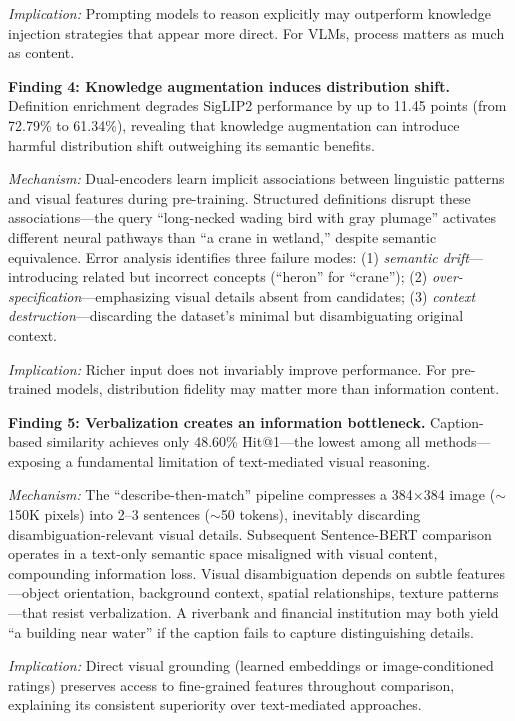 \documentclass[11pt]{article}
\begin{document}
\textit{Implication:} Prompting models to reason explicitly may outperform knowledge injection strategies that appear more direct. For VLMs, process matters as much as content.

\textbf{Finding 4: Knowledge augmentation induces distribution shift.}
Definition enrichment degrades SigLIP2 performance by up to 11.45 points (from 72.79\% to 61.34\%), revealing that knowledge augmentation can introduce harmful distribution shift outweighing its semantic benefits.

\textit{Mechanism:} Dual-encoders learn implicit associations between linguistic patterns and visual features during pre-training. Structured definitions disrupt these associations---the query ``long-necked wading bird with gray plumage'' activates different neural pathways than ``a crane in wetland,'' despite semantic equivalence. Error analysis identifies three failure modes: (1) \textit{semantic drift}---introducing related but incorrect concepts (``heron'' for ``crane''); (2) \textit{over-specification}---emphasizing visual details absent from candidates; (3) \textit{context destruction}---discarding the dataset's minimal but disambiguating original context.

\textit{Implication:} Richer input does not invariably improve performance. For pre-trained models, distribution fidelity may matter more than information content.

\textbf{Finding 5: Verbalization creates an information bottleneck.}
Caption-based similarity achieves only 48.60\% Hit@1---the lowest among all methods---exposing a fundamental limitation of text-mediated visual reasoning.

\textit{Mechanism:} The ``describe-then-match'' pipeline compresses a 384$\times$384 image ($\sim$150K pixels) into 2--3 sentences ($\sim$50 tokens), inevitably discarding disambiguation-relevant visual details. Subsequent Sentence-BERT comparison operates in a text-only semantic space misaligned with visual content, compounding information loss. Visual disambiguation depends on subtle features---object orientation, background context, spatial relationships, texture patterns---that resist verbalization. A riverbank and financial institution may both yield ``a building near water'' if the caption fails to capture distinguishing details.

\textit{Implication:} Direct visual grounding (learned embeddings or image-conditioned ratings) preserves access to fine-grained features throughout comparison, explaining its consistent superiority over text-mediated approaches.
\end{document}
